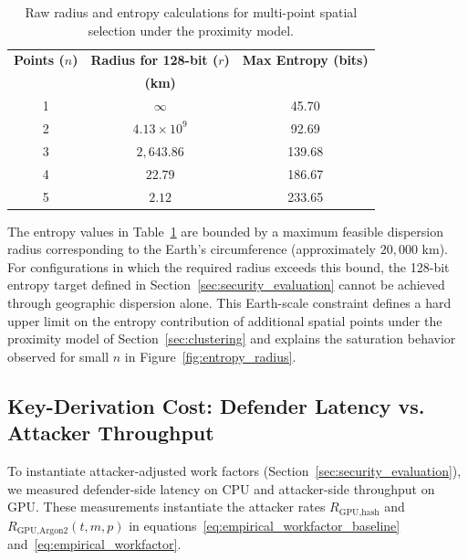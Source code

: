 \documentclass[journal,article,submit,pdftex,moreauthors]{Definitions/mdpi}
\begin{document}
\begin{table}[H]
\caption{Raw radius and entropy calculations for multi-point spatial selection under the proximity model.}
\label{tab:raw_radius_entropy}
\centering
\begin{tabular}{ccc}
\toprule
\textbf{Points ($n$)} & \textbf{Radius for 128-bit ($r$)} & \textbf{Max Entropy (bits)} \\
 & \textbf{(km)} & \\
\midrule
1 & $\infty$ & 45.70 \\
2 & $4.13 \times 10^{9}$ & 92.69 \\
3 & $2{,}643.86$ & 139.68 \\
4 & $22.79$ & 186.67 \\
5 & $2.12$ & 233.65 \\
\bottomrule
\end{tabular}
\end{table}

The entropy values in Table~\ref{tab:raw_radius_entropy} are bounded by a maximum feasible dispersion radius corresponding to the Earth’s circumference (approximately $20{,}000$ km). For configurations in which the required radius exceeds this bound, the 128-bit entropy target defined in Section~\ref{sec:security_evaluation} cannot be achieved through geographic dispersion alone. This Earth-scale constraint defines a hard upper limit on the entropy contribution of additional spatial points under the proximity model of Section~\ref{sec:clustering} and explains the saturation behavior observed for small $n$ in Figure~\ref{fig:entropy_radius}.





\subsection{Key-Derivation Cost: Defender Latency vs. Attacker Throughput}
\label{sec:hardware_benchmarks}

To instantiate attacker-adjusted work factors (Section~\ref{sec:security_evaluation}), we measured defender-side latency on CPU and attacker-side throughput on GPU. These measurements instantiate the attacker rates $R_{\text{GPU,hash}}$ and $R_{\text{GPU,Argon2}}(t,m,p)$ in equations~\ref{eq:empirical_workfactor_baseline} and~\ref{eq:empirical_workfactor}.
\end{document}
